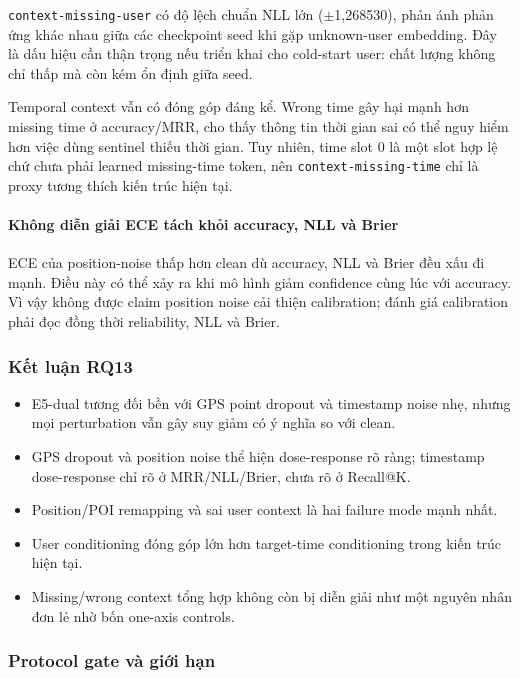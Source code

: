 \texttt{context-missing-user} có độ lệch chuẩn NLL lớn ($\pm$1,268530), phản ánh phản ứng khác nhau giữa các checkpoint seed khi gặp unknown-user embedding. Đây là dấu hiệu cần thận trọng nếu triển khai cho cold-start user: chất lượng không chỉ thấp mà còn kém ổn định giữa seed.

Temporal context vẫn có đóng góp đáng kể. Wrong time gây hại mạnh hơn missing time ở accuracy/MRR, cho thấy thông tin thời gian sai có thể nguy hiểm hơn việc dùng sentinel thiếu thời gian. Tuy nhiên, time slot 0 là một slot hợp lệ chứ chưa phải learned missing-time token, nên \texttt{context-missing-time} chỉ là proxy tương thích kiến trúc hiện tại.

\paragraph{Không diễn giải ECE tách khỏi accuracy, NLL và Brier}

ECE của position-noise thấp hơn clean dù accuracy, NLL và Brier đều xấu đi mạnh. Điều này có thể xảy ra khi mô hình giảm confidence cùng lúc với accuracy. Vì vậy không được claim position noise cải thiện calibration; đánh giá calibration phải đọc đồng thời reliability, NLL và Brier.

\subsubsection*{Kết luận RQ13}

\begin{itemize}
\item E5-dual tương đối bền với GPS point dropout và timestamp noise nhẹ, nhưng mọi perturbation vẫn gây suy giảm có ý nghĩa so với clean.
\item GPS dropout và position noise thể hiện dose-response rõ ràng; timestamp dose-response chỉ rõ ở MRR/NLL/Brier, chưa rõ ở Recall@K.
\item Position/POI remapping và sai user context là hai failure mode mạnh nhất.
\item User conditioning đóng góp lớn hơn target-time conditioning trong kiến trúc hiện tại.
\item Missing/wrong context tổng hợp không còn bị diễn giải như một nguyên nhân đơn lẻ nhờ bốn one-axis controls.
\end{itemize}

\subsubsection*{Protocol gate và giới hạn}

